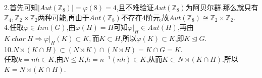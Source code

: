 \documentclass[b5paper]{ctexart}
\begin{document}
2.首先可知$|Aut(\mathbb{Z}_8)|=\varphi(8)=4$,且不难验证$Aut(\mathbb{Z}_8)$为阿贝尔群.那么就只有$\mathbb{Z}_4,\mathbb{Z}_2\times\mathbb{Z}_2$两种可能,再由于$Aut(\mathbb{Z}_8)$不存在4阶元,故$Aut(\mathbb{Z}_8)\cong \mathbb{Z}_2\times\mathbb{Z}_2$.\\
4.任取$\varphi\in Inn(G)$,由$\varphi(H)=H$可知$\varphi|_{H}\in Aut(H)$,再由$K~char~H\Rightarrow \varphi|_{H}(K)\subset K,$而$K\subset H$,所以$\varphi(K)\subset K$,即$K \unlhd G.$\\
10.$N\rtimes (K\cap H)\subset (N\rtimes K)\cap (N\rtimes H)=K\cap G=K.$\\
任取$k=nh\in K$,由$N\leq K$,$h=n^{-1}(nh)\in K$,从而$K\subset N\rtimes (K\cap H)$.所以$K=N\rtimes (K\cap H)$.
\end{document}
